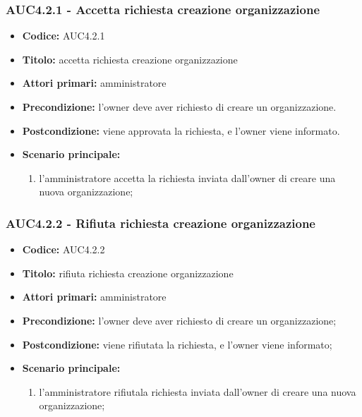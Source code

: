 \documentclass[casi-duso]{subfiles}
\begin{document}
\subsubsection{AUC4.2.1 - Accetta richiesta creazione organizzazione}%
\label{subsub:AUC4.2.1}
\begin{itemize}
  \item \textbf{Codice:} AUC4.2.1
  \item \textbf{Titolo:} accetta richiesta creazione organizzazione
  \item \textbf{Attori primari:} amministratore
  \item \textbf{Precondizione:} l'owner deve aver richiesto di creare un organizzazione.
  \item \textbf{Postcondizione:} viene approvata la richiesta, e l'owner viene informato.
  \item \textbf{Scenario principale:}
  \begin{enumerate}
    \item  l'amministratore accetta la richiesta inviata dall'owner di creare una nuova organizzazione;
  \end{enumerate}
\end{itemize}

\subsubsection{AUC4.2.2 - Rifiuta richiesta creazione organizzazione}%
\label{subsub:AUC4.2.2}
\begin{itemize}
  \item \textbf{Codice:} AUC4.2.2
  \item \textbf{Titolo:} rifiuta richiesta creazione organizzazione
  \item \textbf{Attori primari:} amministratore
  \item \textbf{Precondizione:} l'owner deve aver richiesto di creare un organizzazione;
  \item \textbf{Postcondizione:} viene rifiutata la richiesta, e l'owner viene informato;
  \item \textbf{Scenario principale:}
  \begin{enumerate}
    \item  l'amministratore rifiutala richiesta inviata dall'owner di creare una nuova organizzazione;
  \end{enumerate}
\end{itemize}
\end{document}
